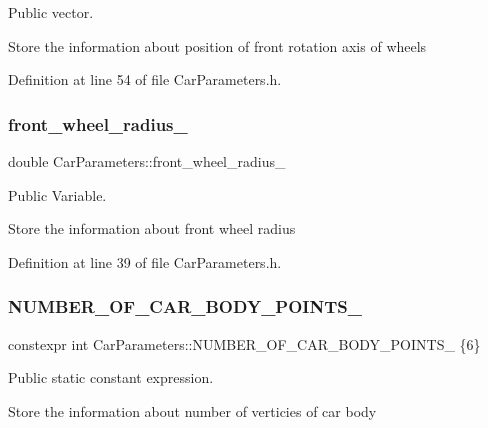 Public vector. 

Store the information about position of front rotation axis of wheels 

Definition at line 54 of file Car\+Parameters.\+h.

\mbox{\label{classCarParameters_ab66832af7618ebe04364630c92850096}} 
\subsubsection{\texorpdfstring{front\+\_\+wheel\+\_\+radius\+\_\+}{front\_wheel\_radius\_}}
{\footnotesize\ttfamily double Car\+Parameters\+::front\+\_\+wheel\+\_\+radius\+\_\+}



Public Variable. 

Store the information about front wheel radius 

Definition at line 39 of file Car\+Parameters.\+h.

\mbox{\label{classCarParameters_a9cd45ac0f506d33d551c86eff1e0fa05}} 
\subsubsection{\texorpdfstring{N\+U\+M\+B\+E\+R\+\_\+\+O\+F\+\_\+\+C\+A\+R\+\_\+\+B\+O\+D\+Y\+\_\+\+P\+O\+I\+N\+T\+S\+\_\+}{NUMBER\_OF\_CAR\_BODY\_POINTS\_}}
{\footnotesize\ttfamily constexpr int Car\+Parameters\+::\+N\+U\+M\+B\+E\+R\+\_\+\+O\+F\+\_\+\+C\+A\+R\+\_\+\+B\+O\+D\+Y\+\_\+\+P\+O\+I\+N\+T\+S\+\_\+ \{6\}\hspace{0.3cm}{\ttfamily [static]}}



Public static constant expression. 

Store the information about number of verticies of car body 

